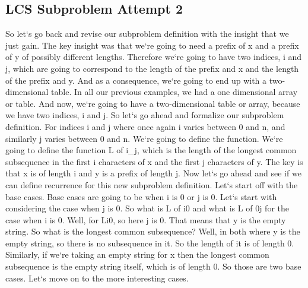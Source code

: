 \subsection{LCS  Subproblem Attempt 2}
So let`s go back and revise our subproblem definition with the insight that we just gain.
The key insight was that we`re going to need a prefix of x and a prefix of y of possibly different lengths.
Therefore we`re going to have two indices, i and j, which are going to correspond to the length of the prefix and x and the length of the prefix and y.
And as a consequence, we`re going to end up with a two-dimensional table.
In all our previous examples, we had a one dimensional array or table.
And now, we`re going to have a two-dimensional table or array, because we have two indices, i and j.
So let`s go ahead and formalize our subproblem definition.
For indices i and j where once again i varies between 0 and n, and similarly j varies between 0 and n.
We`re going to define the function.
We`re going to define the function L of i\_j, which is the length of the longest common subsequence in the first i characters of x and the first j characters of y.
The key is that x is of length i and y is a prefix of length j.
Now let`s go ahead and see if we can define recurrence for this new subproblem definition.
Let`s start off with the base cases.
Base cases are going to be when i is 0 or j is 0.
Let`s start with considering the case when j is 0.
So what is L of i0 and what is L of 0j for the case when i is 0.
Well, for Li0, so here j is 0.
That means that y is the empty string.
So what is the longest common subsequence? Well, in both where y is the empty string, so there is no subsequence in it.
So the length of it is of length 0.
Similarly, if we`re taking an empty string for x then the longest common subsequence is the empty string itself, which is of length 0.
So those are two base cases.
Let`s move on to the more interesting cases.

